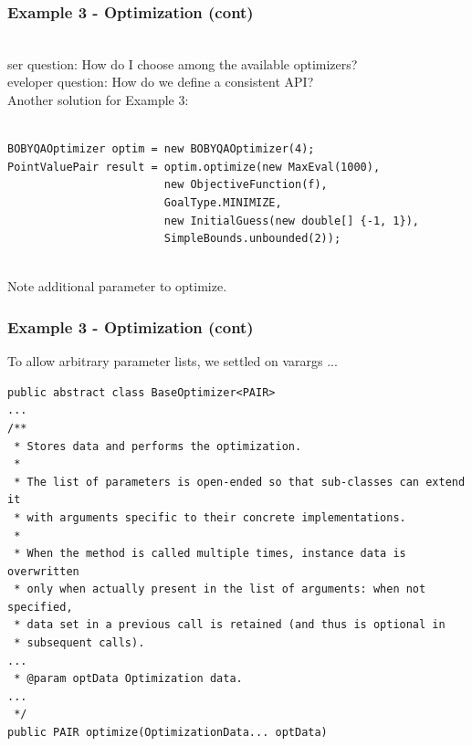 \documentclass[14pt,mathserif]{beamer}
\newcommand{\fblue}[1]{\usebeamercolor[fg]{frametitle}{#1}}
\begin{document}
\begin{frame}[fragile]
  \frametitle{Example 3 - Optimization (cont)}

\begin{small}
\\
{\fblue User question:} How do I choose among the available optimizers? \\
{\fblue Developer question:} How do we define a consistent API? \\

Another solution for Example 3:

\begin{verbatim}

BOBYQAOptimizer optim = new BOBYQAOptimizer(4);
PointValuePair result = optim.optimize(new MaxEval(1000),
                        new ObjectiveFunction(f),
                        GoalType.MINIMIZE,
                        new InitialGuess(new double[] {-1, 1}),
                        SimpleBounds.unbounded(2));
\end{verbatim}
\\
Note additional parameter to optimize.

\end{small}
\end{frame}

\begin{frame}[fragile]
  \frametitle{Example 3 - Optimization (cont)}

\begin{small}
To allow arbitrary parameter lists, we settled on varargs ...

\begin{verbatim}
public abstract class BaseOptimizer<PAIR>
...
/**
 * Stores data and performs the optimization.
 * 
 * The list of parameters is open-ended so that sub-classes can extend it
 * with arguments specific to their concrete implementations.
 * 
 * When the method is called multiple times, instance data is overwritten
 * only when actually present in the list of arguments: when not specified,
 * data set in a previous call is retained (and thus is optional in
 * subsequent calls).
...
 * @param optData Optimization data.
...
 */
public PAIR optimize(OptimizationData... optData)
\end{verbatim} 
\end{small}
\end{frame}
\end{document}
